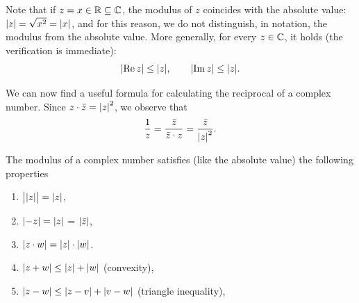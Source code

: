 Note that if $z = x \in {\mathbb R} \subseteq {\mathbb C}$, the modulus of $z$ coincides
with the absolute value: ${\left|z\right|} = \sqrt{x^2} = {\left|x\right|}$, and for this
reason, we do not distinguish, in notation, the modulus from the absolute value.
More generally, for every $z\in {\mathbb C}$, it holds (the verification is immediate):
\[
  {\left|\operatorname{Re} z\right|} \le {\left|z\right|}, \qquad
  {\left|\operatorname{Im}z\right|} \le {\left|z\right|}.
\]

We can now find a useful formula for calculating
the reciprocal of a complex number. Since
$z\cdot \bar z = {\left|z\right|}^2$, we observe that
\[
  \frac{1}{z}
  = \frac{\bar z}{ \bar z \cdot z}
  = \frac{\bar z}{{\left|z\right|}^2}.
\]

\begin{theorem}
The modulus of a complex number satisfies (like the absolute value)
the following properties
\begin{enumerate}
\item $\big\lvert{\left|z\right|}\big\rvert = {\left|z\right|}$,
\item ${\left|-z\right|} = {\left|z\right|}$ = ${\left|\bar z\right|}$,
\item ${\left|z\cdot w\right|} = {\left|z\right|}\cdot{\left|w\right|}$.
\item ${\left|z+w\right|} \le {\left|z\right|}+{\left|w\right|}$ (convexity),
\item ${\left|z-w\right|} \le {\left|z-v\right|} + {\left|v-w\right|}$ (triangle inequality),
\end{enumerate}
\end{theorem}
%
